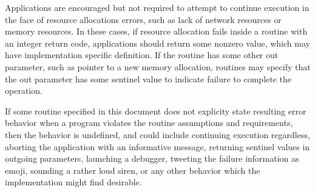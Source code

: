 Applications are encouraged but not required to attempt to continue execution in the face of resource allocations errors, such as lack of network resources or memory resources. In these cases, if resource allocation fails inside a routine with an integer return code, applications should return some nonzero value, which may have implementation specific definition. If the routine has some other out parameter, such as pointer to a new memory allocation, routines may specify that the out parameter has some sentinel value to indicate failure to complete the operation.

If some routine specified in this document does not explicity state resulting error behavior when a program violates the routine assumptions and requirements, then the behavior is undefined, and could include continuing execution regardless, aborting the application with an informative message, returning sentinel values in outgoing parameters, launching a debugger, tweeting the failure information as emoji, sounding a rather loud siren, or any other behavior which the implementation might find desirable.
